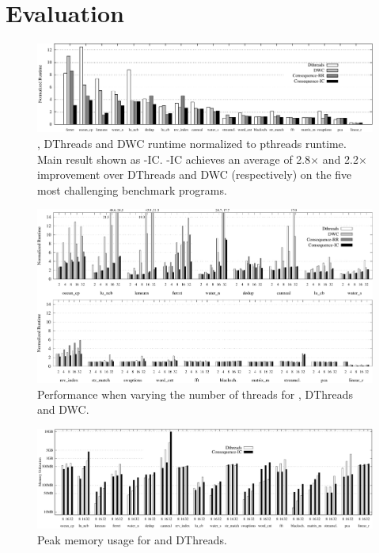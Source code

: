 \section{Evaluation}
\label{s:eval}

\begin{figure}
\centering
\includegraphics[width=7.0in]{figures/overall_runtimes.pdf}
\caption{\lib{}, DThreads and DWC runtime normalized to pthreads runtime. Main result shown as \lib{}-IC. \lib{}-IC achieves an average of 2.8$\times$ and 2.2$\times$ improvement over DThreads and DWC (respectively) on the five most challenging benchmark programs.}
\label{f:performance}
\end{figure}

\begin{figure}
\centering
\includegraphics[width=7.0in]{figures/scalability_results.pdf}

\caption{Performance when varying the number of threads for \lib{}, DThreads and DWC.}
\label{f:scalability}
\end{figure}

\begin{figure}
\centering
\includegraphics[width=7.0in]{figures/memory_utilization.pdf}
\caption{Peak memory usage for \lib{} and DThreads.}
\label{f:memory}
\end{figure}

